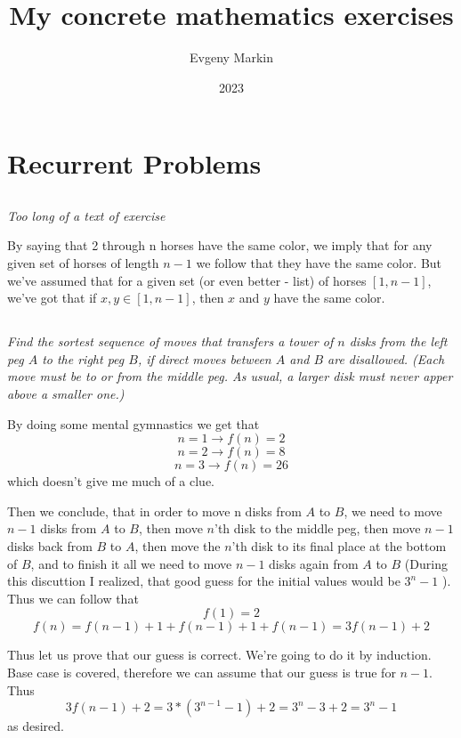\documentclass[11pt,oneside,titlepage]{book}
\title{My concrete mathematics exercises}
\author{Evgeny Markin}
\date{2023}
\begin{document}
\maketitle
\tableofcontents

\chapter{Recurrent Problems}

\section{}

\textit{Too long of a text of exercise}

By saying that 2 through n horses have the same color, we imply that for any given
set of horses of length $n - 1$ we follow that they have the same color. But we've assumed
that for a given set (or even better - list) of horses $[1, n - 1]$, we've got that
if $x, y \in [1, n - 1]$, then $x$ and $y$ have the same color.

\section{}

\textit{Find the sortest sequence of moves that transfers a tower of $n$ disks from the
  left peg $A$ to the right peg $B$, if direct moves between $A$ and $B$ are disallowed. (Each
  move must be to or from the middle peg. As usual, a larger disk must never apper above
  a smaller one.)}

By doing some mental gymnastics we get that
$$n = 1 \to f(n) = 2$$
$$n = 2 \to f(n) = 8$$
$$n = 3 \to f(n) = 26$$
which doesn't give me much of a clue.

Then we conclude, that in order to move  n disks from $A$ to $B$, we need to move $n - 1$ disks
from $A$ to $B$, then move $n$'th disk to the middle peg, then move $n - 1$ disks back from $B$
to $A$, then move the $n$'th disk to its final place at the bottom of $B$, and to finish
it all we need to move $n - 1$ disks again from $A$ to $B$ (During this discuttion I realized,
that good guess for the initial values would be $3^n - 1$ ). Thus we can follow that
$$f(1) = 2$$
$$f(n) = f(n - 1) + 1 + f(n - 1) + 1 + f(n - 1) = 3f(n - 1) + 2$$

Thus let us prove that our guess is correct. We're going to do it by induction. Base case is
covered, therefore we can assume that our guess is true for $n - 1$. Thus
$$3f(n - 1) + 2 = 3* (3^{n - 1} - 1) + 2 = 3^n - 3 + 2 = 3^n - 1$$
as desired.
\end{document}
